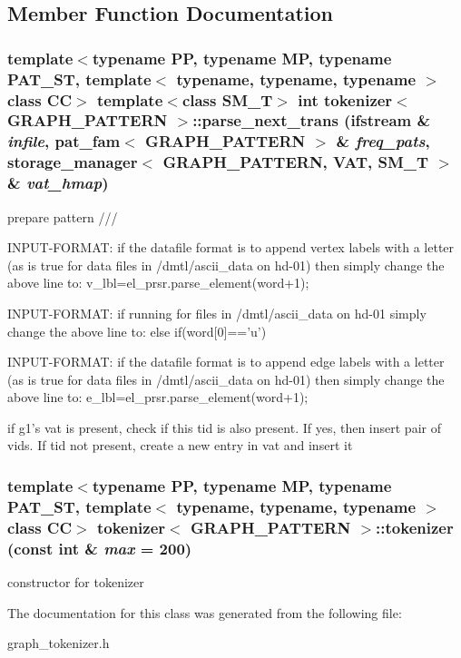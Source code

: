 \subsection{Member Function Documentation}
\subsubsection{\setlength{\rightskip}{0pt plus 5cm}template$<$typename PP, typename MP, typename PAT\_\-ST, template$<$ typename, typename, typename $>$ class CC$>$ template$<$class SM\_\-T$>$ int {\bf tokenizer}$<$ GRAPH\_\-PATTERN $>$::parse\_\-next\_\-trans (ifstream \& {\em infile}, {\bf pat\_\-fam}$<$ GRAPH\_\-PATTERN $>$ \& {\em freq\_\-pats}, {\bf storage\_\-manager}$<$ GRAPH\_\-PATTERN, {\bf VAT}, SM\_\-T $>$ \& {\em vat\_\-hmap})\hspace{0.3cm}{\tt  [inline]}}\label{classtokenizer_3_01GRAPH__PATTERN_01_4_a1}


prepare pattern ///

INPUT-FORMAT: if the datafile format is to append vertex labels with a letter (as is true for data files in /dmtl/ascii\_\-data on hd-01) then simply change the above line to: v\_\-lbl=el\_\-prsr.parse\_\-element(word+1);

INPUT-FORMAT: if running for files in /dmtl/ascii\_\-data on hd-01 simply change the above line to: else if(word[0]=='u')

INPUT-FORMAT: if the datafile format is to append edge labels with a letter (as is true for data files in /dmtl/ascii\_\-data on hd-01) then simply change the above line to: e\_\-lbl=el\_\-prsr.parse\_\-element(word+1);

if g1's vat is present, check if this tid is also present. If yes, then insert pair of vids. If tid not present, create a new entry in vat and insert it 
\subsubsection{\setlength{\rightskip}{0pt plus 5cm}template$<$typename PP, typename MP, typename PAT\_\-ST, template$<$ typename, typename, typename $>$ class CC$>$ {\bf tokenizer}$<$ GRAPH\_\-PATTERN $>$::{\bf tokenizer} (const int \& {\em max} = 200)\hspace{0.3cm}{\tt  [inline]}}\label{classtokenizer_3_01GRAPH__PATTERN_01_4_a0}


constructor for tokenizer 

The documentation for this class was generated from the following file:\begin{CompactItemize}
\item 
graph\_\-tokenizer.h\end{CompactItemize}
